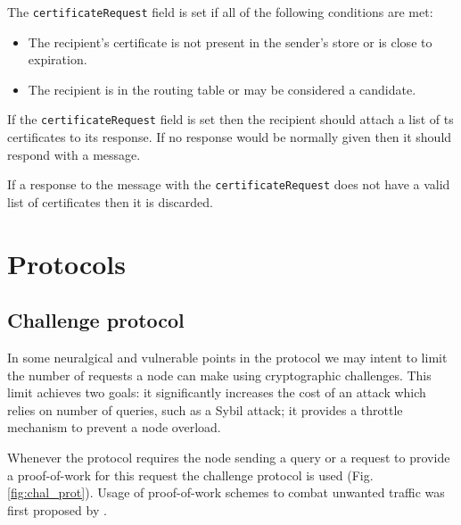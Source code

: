 The \texttt{certificateRequest} field is set if all of the following conditions
are met:

\begin{itemize}
  \item The recipient's certificate is not present in the sender's store or is
    close to expiration.
  \item The recipient is in the routing table or may be considered a candidate.
\end{itemize}

If the \texttt{certificateRequest} field is set then the recipient should attach
a list of ts certificates to its response. If no response would be normally
given then it should respond with a  message.

If a response to the message with the \texttt{certificateRequest} does not have
a valid list of certificates then it is discarded.

\section{Protocols}
\label{sec:ghoul_protocols}
\subsection{Challenge protocol}
In some neuralgical and vulnerable points in the protocol we may intent to limit
the number of requests a node can make using cryptographic challenges. This
limit achieves two goals: it significantly increases the cost of an attack which
relies on number of queries, such as a Sybil attack; it provides a throttle
mechanism to prevent a node overload.

Whenever the protocol requires the node sending a query or a request to provide
a proof-of-work for this request the challenge protocol is used
(Fig. \ref{fig:chal_prot}).
Usage of proof-of-work schemes to combat unwanted traffic was first proposed by
\cite{dwo93}.

